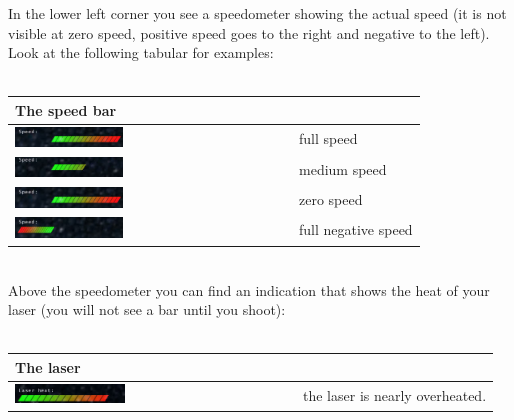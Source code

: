 \documentclass[a4paper,11pt]{article}
\begin{document}
In the lower left corner you see a speedometer showing the actual speed (it is not visible at zero speed, positive speed goes to the right and negative to the left). Look at the following tabular for examples:\\
\ \\
\begin{tabularx}{\textwidth}{|m{}|X|}
	\hline
		\multicolumn{2}{|l|}{\textbf{The speed bar}\label{speed}}\\
	\hline
		\includegraphics[width=0.4\textwidth]{fullspeed.jpg}	 			& full speed\\
		\includegraphics[width=0.4\textwidth]{mediumspeed.jpg} 			& medium speed\\
		\includegraphics[width=0.4\textwidth]{fullspeed.jpg}   			& zero speed\\
		\includegraphics[width=0.4\textwidth]{fullnegativespeed.jpg}& full negative speed\\
	\hline
\end{tabularx}
\ \\
Above the speedometer you can find an indication that shows the heat of your laser (you will not see a bar until you shoot):\\
\ \\
\begin{tabularx}{\textwidth}{|m{}|X|}
	\hline
		\multicolumn{2}{|l|}{\textbf{The laser\label{laserheat}}}\\
  \hline
  	\includegraphics[width=0.4\textwidth]{laserheat.jpg} 				& the laser is nearly overheated.\\
  \hline
\end{tabularx}
\ \\
\end{document}
